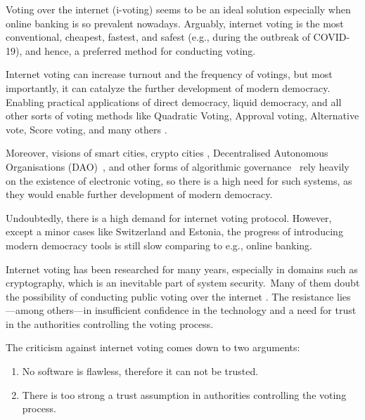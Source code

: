 \documentclass{article}
\begin{document}
Voting over the internet (i-voting) seems to be an ideal solution especially when online banking is so prevalent nowadays. Arguably, internet voting is the most conventional, cheapest, fastest, and safest (e.g., during the outbreak of COVID-19), and hence, a preferred method for conducting voting.

Internet voting can increase turnout and the frequency of votings, but most importantly, it can catalyze the further development of modern democracy. Enabling practical applications of direct democracy, liquid democracy, and all other sorts of voting methods like Quadratic Voting, Approval voting, Alternative vote, Score voting, and many others \cite{laslierLoserPluralityVoting2011}.

Moreover, visions of smart cities, crypto cities \cite{buterinCryptoCities2021}, Decentralised Autonomous Organisations (DAO)~\cite{wangDecentralizedAutonomousOrganizations2019}, and other forms of algorithmic governance~\cite{GovernmentAlgorithm2022} rely heavily on the existence of electronic voting, so there is a high need for such systems, as they would enable further development of modern democracy.

Undoubtedly, there is a high demand for internet voting protocol. However, except a minor cases like Switzerland and Estonia, the progress of introducing modern democracy tools is still slow comparing to e.g., online banking.

Internet voting has been researched for many years, especially in domains such as cryptography, which is an inevitable part of system security. Many of them doubt the possibility of conducting public voting over the internet \cite{parkGoingBadWorse2021, mearianWhyBlockchainbasedVoting2019, shanklandNoBlockchainIsn2018, leeBlockchainbasedElectionsWould2018, schneierBlockchainVoting2020, schneierBlockchainTrust2019}. The resistance lies—among others—in insufficient confidence in the technology and a need for trust in the authorities controlling the voting process.

The criticism against internet voting comes down to two arguments:

\begin{enumerate}
    \item No software is flawless, therefore it can not be trusted.
    \item There is too strong a trust assumption in authorities controlling the voting process.
\end{enumerate}
\end{document}
